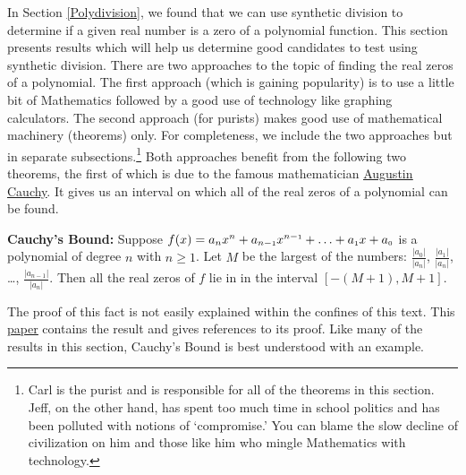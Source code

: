 

\setcounter{footnote}{0}

\label{RealZeros}

In Section \ref{Polydivision}, we found that we can use synthetic division to determine if a given real number is a zero of a polynomial function.  This section presents results which will help us determine good candidates to test using synthetic division.  There are two approaches to the topic of finding the real zeros of a polynomial.  The first approach (which is gaining popularity) is to use a little bit of Mathematics followed by a good use of technology like graphing calculators.  The second approach (for purists) makes good use of mathematical machinery (theorems) only.  For completeness, we include the two approaches but in separate subsections.\footnote{Carl is the purist and is responsible for all of the theorems in this section.  Jeff, on the other hand, has spent too much time in school politics and has been polluted with notions of `compromise.'  You can blame the slow decline of civilization on him and those like him who mingle Mathematics with technology.}  Both approaches benefit from the following two theorems, the first of which is due to the famous mathematician \href{http://en.wikipedia.org/wiki/Cauchy}{\underline{Augustin Cauchy}}.  It gives us an interval on which all of the real zeros of a polynomial can be found.

\smallskip

\colorbox{ResultColor}{\bbm

\begin{thm} \label{CauchysBound}\textbf{Cauchy's Bound:}  Suppose $f(x) = a_{n} x^{n} + a_{n-\mbox{\tiny$1$}}x^{n-\mbox{\tiny$1$}} + \ldots + a_{\mbox{\tiny$1$}} x + a_{\mbox{\tiny$0$}}$ is a polynomial of degree $n$ with $n \geq 1$.  Let $M$ be the largest of the numbers: $\frac{|a_{0}|}{|a_{n}|}$, $\frac{|a_{1}|}{|a_{n}|}$, \ldots, $\frac{|a_{n-1}|}{|a_{n}|}$.  Then all the real zeros of $f$ lie in in the interval $[-(M+1),M+1]$.
\end{thm}

\ebm}

\smallskip

The proof of this fact is not easily explained within the confines of this text.  This \href{http://titan.princeton.edu/papers/claire/hertz-etal-99.ps}{\underline{paper}} contains the result and gives references to its proof. Like many of the results in this section, Cauchy's Bound is best understood with an example.

